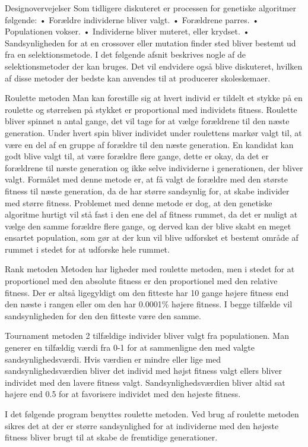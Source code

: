 Designovervejelser
Som tidligere diskuteret er processen for genetiske algoritmer følgende:
•	Forældre individerne bliver valgt.
•	Forældrene parres.
•	Populationen vokser.
•	Individerne bliver muteret, eller krydset.
•	Sandsynligheden for at en crossover eller mutation finder sted bliver bestemt ud fra en selektionsmetode.
I det følgende afsnit beskrives nogle af de selektionsmetoder der kan bruges. Det vil endvidere også blive diskuteret, hvilken af disse metoder der bedste kan anvendes til at producerer skoleskemaer.

Roulette metoden
Man kan forestille sig at hvert individ er tildelt et stykke på en roulette og størrelsen på stykket er proportional med individets fitness. Roulette bliver spinnet n antal gange, det vil tage for at vælge forældrene til den næste generation. Under hvert spin bliver individet under roulettens markør valgt til, at være en del af en gruppe af forældre til den næste generation. En kandidat kan godt blive valgt til, at være forældre flere gange, dette er okay, da det er forældrene til næste generation og ikke selve individerne i generationen, der bliver valgt. Formålet med denne metode er, at få valgt de forældre med den største fitness til næste generation, da de har større sandsynlig for, at skabe individer med større fitness. Problemet med denne metode er dog, at den genetiske algoritme hurtigt vil stå fast i den ene del af fitness rummet, da det er muligt at vælge den samme forældre flere gange, og derved kan der blive skabt en meget ensartet population, som gør at der kun vil blive udforsket et bestemt område af rummet i stedet for at udforske hele rummet.

Rank metoden
Metoden har ligheder med roulette metoden, men i stedet for at proportionel med den absolute fitness er den proportionel med den relative fitness. Der er altså ligegyldigt om den fitteste har 10 gange højere fitness end den næste i rangen eller om den har 0.0001\% højere fitness. I begge tilfælde vil sandsynligheden for den den fitteste være den samme.

Tournament metoden
2 tilfældige individer bliver valgt fra populationen. Man generer en tilfældig værdi fra 0-1 for at sammenligne den med valgte sandsynlighedsværdi. Hvis værdien er mindre eller lige med sandsynlighedsværdien bliver det individ med højst fitness valgt ellers bliver individet med den lavere fitness valgt. Sandsynlighedsværdien bliver altid sat højere end 0.5 for at favorisere individet med den højeste fitness. 

I det følgende program benyttes roulette metoden. Ved brug af roulette metoden sikres det at der er større sandsynlighed for at individerne med den højeste fitness bliver brugt til at skabe de fremtidige generationer. 
